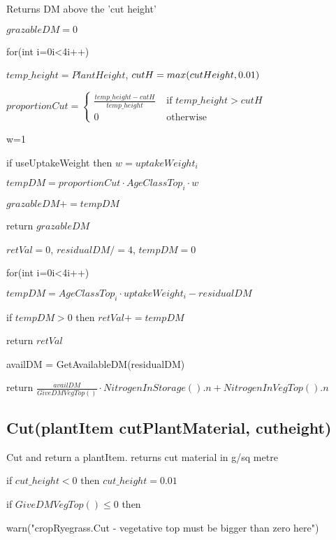 \documentclass[%
]{scrartcl}
\begin{document}

Returns DM above the 'cut height'


   $grazableDM = 0$

   for(int i=0i<4i++)
   
    \quad  $temp\_height=PlantHeight$, $cutH=\\max(cutHeight,0.01)$

    \quad $proportionCut= \begin{cases}
               \tfrac{temp\_height - cutH}{temp\_height} &   \text{ if } temp\_height>cutH \\
               0 & \text{ otherwise}        \end{cases}$

    \quad    w=1

    \quad if useUptakeWeight then  $ w=uptakeWeight_i$

    \quad  $tempDM=proportionCut  \cdot  AgeClassTop_i  \cdot  w$
     
    \quad   $grazableDM +=tempDM$
 
   return $grazableDM$



   $retVal=0$, $residualDM/=4$, $tempDM=0$

   for(int i=0i<4i++)
  
   \quad $tempDM=AgeClassTop_i  \cdot  uptakeWeight_i - residualDM$

   \quad if $tempDM>0$ then $retVal+=tempDM$
  
   return $retVal$



 
   availDM = GetAvailableDM(residualDM)

   return $\tfrac{availDM}{GiveDMVegTop()}  \cdot  NitrogenInStorage().n + NitrogenInVegTop().n$


\subsection{Cut(plantItem cutPlantMaterial, cutheight)}

Cut and return a plantItem. returns cut material in g/sq metre


   if $cut\_height<0$ then $cut\_height=0.01$

   if $GiveDMVegTop() \le 0$ then

   \quad   warn("cropRyegrass.Cut - vegetative top must be bigger than zero here")
\end{document}
